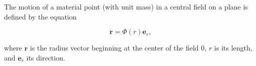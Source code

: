 The motion of a material point (with unit mass) in a central field on a plane is defined by the equation

$$\ddot{\mathbf{r}} = \Phi(r)\mathbf{e}_r,$$

where $\mathbf{r}$ is the radius vector beginning at the center of the field $0$, $r$ is its length, and $\mathbf{e}_r$ its direction.
